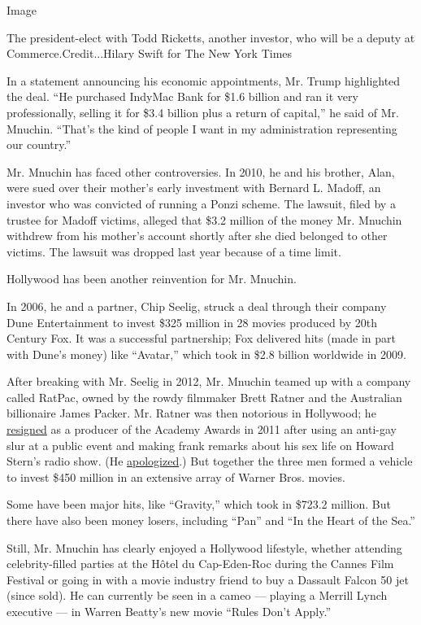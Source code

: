 Image

The president-elect with Todd Ricketts, another investor, who will be a
deputy at Commerce.Credit...Hilary Swift for The New York Times

In a statement announcing his economic appointments, Mr. Trump
highlighted the deal. ``He purchased IndyMac Bank for \$1.6 billion and
ran it very professionally, selling it for \$3.4 billion plus a return
of capital,'' he said of Mr. Mnuchin. ``That's the kind of people I want
in my administration representing our country.''

Mr. Mnuchin has faced other controversies. In 2010, he and his brother,
Alan, were sued over their mother's early investment with Bernard L.
Madoff, an investor who was convicted of running a Ponzi scheme. The
lawsuit, filed by a trustee for Madoff victims, alleged that \$3.2
million of the money Mr. Mnuchin withdrew from his mother's account
shortly after she died belonged to other victims. The lawsuit was
dropped last year because of a time limit.

Hollywood has been another reinvention for Mr. Mnuchin.

In 2006, he and a partner, Chip Seelig, struck a deal through their
company Dune Entertainment to invest \$325 million in 28 movies produced
by 20th Century Fox. It was a successful partnership; Fox delivered hits
(made in part with Dune's money) like ``Avatar,'' which took in \$2.8
billion worldwide in 2009.

After breaking with Mr. Seelig in 2012, Mr. Mnuchin teamed up with a
company called RatPac, owned by the rowdy filmmaker Brett Ratner and the
Australian billionaire James Packer. Mr. Ratner was then notorious in
Hollywood; he
\href{http://www.nytimes.com/2011/11/09/business/media/movie-figure-brett-ratner-resigns-as-oscar-co-producer.html}{resigned}
as a producer of the Academy Awards in 2011 after using an anti-gay slur
at a public event and making frank remarks about his sex life on Howard
Stern's radio show. (He
\href{http://www.hollywoodreporter.com/news/brett-ratner-gay-slur-apology-tower-heist-258316}{apologized}.)
But together the three men formed a vehicle to invest \$450 million in
an extensive array of Warner Bros. movies.

Some have been major hits, like ``Gravity,'' which took in \$723.2
million. But there have also been money losers, including ``Pan'' and
``In the Heart of the Sea.''

Still, Mr. Mnuchin has clearly enjoyed a Hollywood lifestyle, whether
attending celebrity-filled parties at the Hôtel du Cap-Eden-Roc during
the Cannes Film Festival or going in with a movie industry friend to buy
a Dassault Falcon 50 jet (since sold). He can currently be seen in a
cameo --- playing a Merrill Lynch executive --- in Warren Beatty's new
movie ``Rules Don't Apply.''

